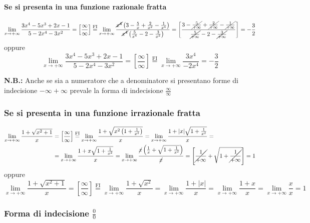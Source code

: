 \paragraph{Se si presenta in una funzione razionale fratta}
\begin{ex}
\[\lim_{x\to +\infty}\frac{3x^4-5x^3+2x-1}{5-2x^4-3x^2}=\left[\frac{\infty}{\infty}\right]\overset{\mathrm{FI}}{=}\lim_{x\to +\infty}\frac{\cancel{x^4}\left( 3-\frac{5}{x}+\frac{2}{x^2}-\frac{1}{x^4} \right)}{\cancel{x^4}\left(\frac{5}{x^4} -2 -\frac{3}{x^2}\right)}=\left[ \frac{ 3-\cancel{\frac{5}{+\infty}}+\cancel{\frac{2}{+\infty}}-\cancel{\frac{1}{+\infty}}}{\cancel{\frac{5}{+\infty}} -2 -\cancel{\frac{3}{+\infty}}} \right]=-\frac{3}{2}\]
oppure
\[\lim_{x\to +\infty}\frac{3x^4-5x^3+2x-1}{5-2x^4-3x^2}=\left[\frac{\infty}{\infty}\right]\overset{\mathrm{FI}}{=}\lim_{x\to +\infty}\frac{3x^4}{-2x^4}=-\frac{3}{2}\]
\end{ex}
\textbf{N.B.:} Anche se sia a numeratore che a denominatore si presentano forme di indecisione $-\infty+\infty$ prevale la forma di indecisione $\frac{\infty}{\infty}$
\subsubsection{Se si presenta in una funzione irrazionale fratta}
\begin{ex}
\[\begin{aligned}\lim_{x\to +\infty}\frac{1+\sqrt{x^2+1}}{x}&=\left[\frac{\infty}{\infty}\right]\overset{\mathrm{FI}}{=}\lim_{x\to +\infty}\frac{1+\sqrt{x^2\left( 1+\frac{1}{x^2} \right)}}{x}=\lim_{x\to +\infty}\frac{1+|x|\sqrt{1+\frac{1}{x^2}}}{x}=\\&=\lim_{x\to +\infty}\frac{1+x\sqrt{1+\frac{1}{x^2}}}{x}=\lim_{x\to +\infty}\frac{\cancel{x}\left( \frac{1}{x} +\sqrt{1+\frac{1}{x^2}}\right)}{\cancel{x}}=\left[ \cancel{\frac{1}{+\infty}} +\sqrt{1+\cancel{\frac{1}{+\infty}}} \right] =1\end{aligned}\]
oppure
\[\lim_{x\to +\infty}\frac{1+\sqrt{x^2+1}}{x}=\left[\frac{\infty}{\infty}\right]\overset{\mathrm{FI}}{=}\lim_{x\to +\infty}\frac{1+\sqrt{x^2}}{x}=\lim_{x\to +\infty}\frac{1+|x|}{x}=\lim_{x\to +\infty}\frac{1+x}{x}=\lim_{x\to +\infty}\frac{x}{x}= 1\]
\end{ex}
\subsubsection{Forma di indecisione $\frac{0}{0}$}
